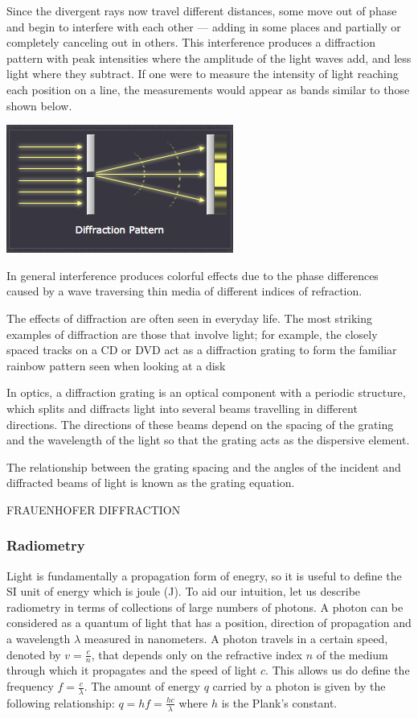 Since the divergent rays now travel different distances, some move out of phase and begin to interfere with each other — adding in some places and partially or completely canceling out in others. This interference produces a diffraction pattern with peak intensities where the amplitude of the light waves add, and less light where they subtract. If one were to measure the intensity of light reaching each position on a line, the measurements would appear as bands similar to those shown below.

\includegraphics[scale=0.5]{images/3.png}

In general interference produces colorful effects due to the phase differences caused by a wave traversing thin media of different indices of refraction.

The effects of diffraction are often seen in everyday life. The most striking examples of diffraction are those that involve light; for example, the closely spaced tracks on a CD or DVD act as a diffraction grating to form the familiar rainbow pattern seen when looking at a disk

In optics, a diffraction grating is an optical component with a periodic structure, which splits and diffracts light into several beams travelling in different directions. The directions of these beams depend on the spacing of the grating and the wavelength of the light so that the grating acts as the dispersive element.

The relationship between the grating spacing and the angles of the incident and diffracted beams of light is known as the grating equation. 

FRAUENHOFER DIFFRACTION

\subsubsection{Radiometry}
Light is fundamentally a propagation form of enegry, so it is useful to define the SI unit of energy which is joule (J). To aid our intuition, let us describe radiometry in terms of collections of large numbers of photons. A photon can be considered as a quantum of light that has a position, direction of propagation and a wavelength $\lambda$ measured in nanometers. A photon travels in a certain speed, denoted by $v = \frac{c}{n}$, that depends only on the refractive index $n$ of the medium through which it propagates and the speed of light $c$. This allows us do define the frequency $f = \frac{c}{\lambda}$. The amount of energy $q$ carried by a photon is given by the following relationship: $q = hf= \frac{hc}{\lambda}$ where $h$ is the Plank's constant.

